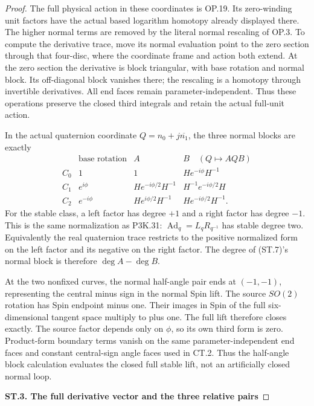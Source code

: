 \begin{proof}
The full physical action in these coordinates is OP.19. Its
zero-winding unit factors have the actual based logarithm homotopy
already displayed there. The higher normal terms are removed by
the literal normal rescaling of OP.3. To compute the derivative
trace, move its normal evaluation point to the zero section through
that four-disc, where the coordinate frame and action both extend.
At the zero section the derivative is block triangular, with base
rotation and normal block. Its off-diagonal block vanishes there;
the rescaling is a homotopy through invertible derivatives. All end
faces remain parameter-independent. Thus these operations preserve
the closed third integrals and retain the actual full-unit action.

In the actual quaternion coordinate
\(Q=n_0+j\overline{n_1}\), the three normal blocks are exactly
\[
 \begin{array}{c|c|c|c}
 &\text{base rotation}& A& B\quad (Q\mapsto AQB)\\ \hline
 C_0&1&1&H e^{-i\phi}H^{-1}\\
 C_1&e^{i\phi}&H e^{-i\phi/2}H^{-1}&H^{-1}e^{-i\phi/2}H\\
 C_2&e^{-i\phi}&H e^{i\phi/2}H^{-1}&H e^{-i\phi/2}H^{-1}.
 \end{array}                                             \tag{ST.7}
\]
For the stable class, a left factor has degree \(+1\) and a right
factor has degree \(-1\). This is the same normalization as
P3K.31: \(\operatorname{Ad}_q=L_qR_{q^{-1}}\) has stable degree
two. Equivalently the real quaternion trace restricts to the
positive normalized form on the left factor and its negative on
the right factor. The degree of (ST.7)'s normal block is therefore
\(\deg A-\deg B\).

At the two nonfixed curves, the normal half-angle pair ends at
\((-1,-1)\), representing the central minus sign in the normal
Spin lift. The source \(SO(2)\) rotation has Spin endpoint minus
one. Their images in Spin of the full six-dimensional tangent
space multiply to plus one. The full lift therefore closes exactly.
The source factor depends only on \(\phi\), so its own third
form is zero. Product-form boundary terms vanish on the same
parameter-independent end faces and constant central-sign angle
faces used in CT.2. Thus the half-angle block calculation evaluates
the closed full stable lift, not an artificially closed normal loop.

\par

\medskip\noindent\textbf{ST.3. The full derivative vector and the three relative pairs}


\end{proof}
